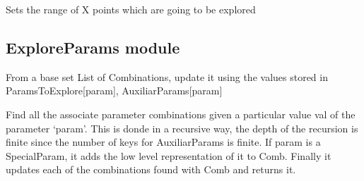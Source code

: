 \documentclass[letterpaper,10pt,english]{sphinxmanual}
\begin{document}
\begin{fulllineitems}

\begin{fulllineitems}
\label{Analisis/Baseclass:Baseclass.BSR.setxRange}
Sets the range of X points which are going to be explored

\end{fulllineitems}


\begin{fulllineitems}
\label{Analisis/Baseclass:Baseclass.BSR.setyRange}
\end{fulllineitems}


\end{fulllineitems}



\subsection{ExploreParams module}
\label{Analisis/ExploreParams:module-ExploreParams}\label{Analisis/ExploreParams::doc}\label{Analisis/ExploreParams:exploreparams-module}

\begin{fulllineitems}
\label{Analisis/ExploreParams:ExploreParams.AddToCombinations}
From a base set List of Combinations, update it using the values stored in ParamsToExplore{[}param{]}, AuxiliarParams{[}param{]}

\end{fulllineitems}


\begin{fulllineitems}
\label{Analisis/ExploreParams:ExploreParams.AddValtoComb}
Find all the associate parameter combinations given a particular value val of the parameter `param'.
This is donde in a recursive way, the depth of the recursion is finite since the number of keys for AuxiliarParams is finite.
If param is a SpecialParam, it adds the low level representation of it to Comb.
Finally it updates each of the combinations found with Comb and returns it.

\end{fulllineitems}
\end{document}
